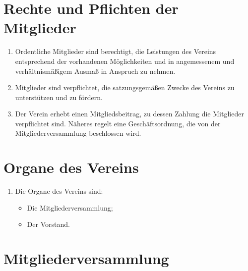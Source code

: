 \documentclass[fontsize=12pt,paper=a4,pagesize]{scrartcl}
\begin{document}
\section{Rechte und Pflichten der Mitglieder}

\begin{enumerate}
	\item Ordentliche Mitglieder sind berechtigt, die Leistungen des
		Vereins entsprechend der vorhandenen Möglichkeiten und in angemessenem
		und verhältnismäßigem Ausmaß in Anspruch zu nehmen.

	\item Mitglieder sind verpflichtet, die satzungsgemäßen Zwecke des
		Vereins zu unterstützen und zu fördern.

	\item Der Verein erhebt einen Mitgliedsbeitrag, zu dessen Zahlung die
		Mitglieder verpflichtet sind. Näheres regelt eine Geschäftsordnung,
		die von der Mitgliederversammlung beschlossen wird.

\end{enumerate}

\section{Organe des Vereins}

\begin{enumerate}
	\item Die Organe des Vereins sind:
		\begin{itemize}
			\item Die Mitgliederversammlung;
			\item Der Vorstand.
		\end{itemize}
\end{enumerate}

\section{Mitgliederversammlung}
\end{document}
